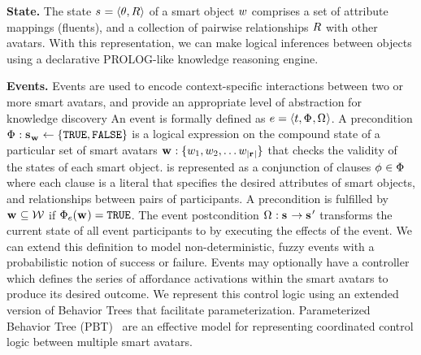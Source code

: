 \noindent \textbf{State.} The state $s_{} = \langle \theta, R \rangle$ of a smart object $w_{}$ comprises a set of attribute mappings \attributeSymbol (fluents), and a collection of pairwise relationships $R$ with other avatars. With this representation, we can make logical inferences between objects using a declarative PROLOG-like knowledge reasoning engine.






\noindent \textbf{Events.} Events are used to encode context-specific interactions between two or more smart avatars, and provide an appropriate level of abstraction for knowledge discovery  An event is formally defined as $e{} = \langle t,  {\Phi}_{}, {\Omega}_{} \rangle$. A precondition ${\Phi}_{}: \mathbf{s_{}}_{\mathbf{w}_{}} \leftarrow \{\textnormal{\texttt{TRUE}}, \textnormal{\texttt{FALSE}} \} $ is a logical expression on the compound state \groupState{\smartObjectGroup{}} of a particular set of smart avatars $\mathbf{w}_{}: \{ w_{1}, w_{2}, \ldots w_{|\mathbf{r}_{}|} \}$ that checks the validity of the states of each smart object. \precondition{} is represented as a conjunction of clauses $\phi_{}^{} \in {\Phi}_{}$ where each clause \clause{}{} is a literal that specifies the desired attributes of smart objects, and relationships between pairs of participants. A precondition is fulfilled by $\mathbf{w}_{} \subseteq \mathcal{W} $ if ${\Phi}_{e}(\mathbf{w}_{}) = \textnormal{\texttt{TRUE}}$. The event postcondition ${\Omega}_{} : \mathbf{s_{}}_{} \rightarrow \mathbf{s_{}}_{}{'}$ transforms the current state of all event participants \groupState{} to \nextGroupState{} by executing the effects of the event. We can extend this definition to model non-deterministic, fuzzy events with a probabilistic notion of success or failure. Events may optionally have a controller which defines the series of affordance activations within the smart avatars to produce its desired outcome. We represent this control logic using an extended version of Behavior Trees that facilitate parameterization. Parameterized Behavior Tree (PBT)~\cite{Shoulson:2011:PBT:2177817.2177835} are an effective model for representing coordinated control logic  between multiple smart avatars.

